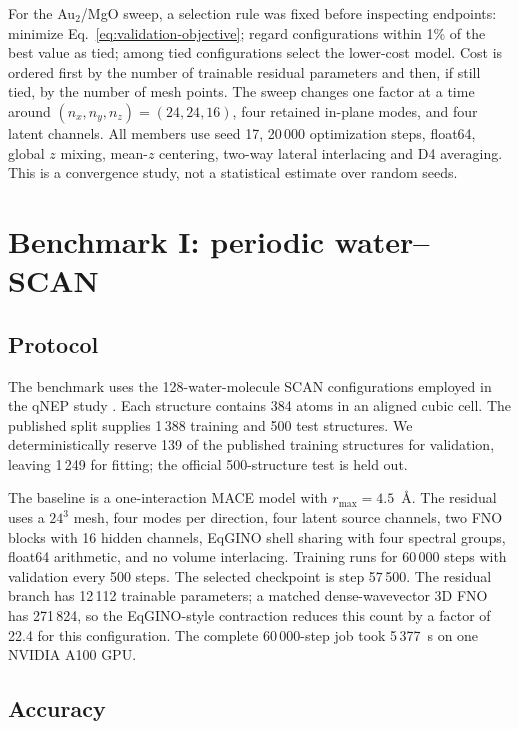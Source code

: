 \documentclass[11pt]{article}
\newcommand{\angstrom}{\ensuremath{\text{\AA}}}
\begin{document}
For the Au$_2$/MgO sweep, a selection rule was fixed before inspecting
endpoints: minimize Eq.~\eqref{eq:validation-objective}; regard configurations
within 1\% of the best value as tied; among tied configurations select the
lower-cost model. Cost is ordered first by the number of trainable residual
parameters and then, if still tied, by the number of mesh points. The sweep
changes one factor at a time around
\((n_x,n_y,n_z)=(24,24,16)\), four retained in-plane modes, and four latent
channels. All members use seed 17, 20\,000 optimization steps, float64,
global \(z\) mixing, mean-\(z\) centering, two-way lateral interlacing and D4
averaging. This is a convergence study, not a statistical estimate over
random seeds.

\section{Benchmark I: periodic water--SCAN}
\label{sec:water}

\subsection{Protocol}

The benchmark uses the 128-water-molecule SCAN \citep{sun2015scan} configurations employed in the
qNEP study \citep{fan2026qnep}. Each structure contains 384 atoms in an
aligned cubic cell. The published split supplies 1\,388 training and 500 test
structures. We deterministically reserve 139 of the published training
structures for validation, leaving 1\,249 for fitting; the official
500-structure test is held out.

The baseline is a one-interaction MACE model with \(r_{\max}=4.5\)~\angstrom.
The residual uses a \(24^3\) mesh, four modes per direction, four latent
source channels, two FNO blocks with 16 hidden channels, EqGINO shell sharing
with four spectral groups, float64 arithmetic, and no volume interlacing.
Training runs for 60\,000 steps with validation every 500 steps. The selected
checkpoint is step 57\,500. The residual branch has 12\,112 trainable
parameters; a matched dense-wavevector 3D FNO has 271\,824, so the
EqGINO-style contraction reduces this count by a factor of 22.4 for this
configuration.
The complete 60\,000-step job took 5\,377~s on one NVIDIA A100 GPU.


\subsection{Accuracy}
\end{document}
